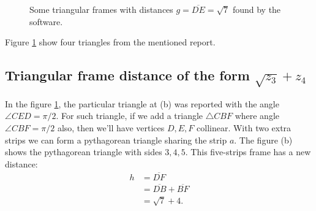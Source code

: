 \documentclass[11pt]{article}
\begin{document}
\begin{figure}[h]
 \centering
\caption{Some triangular frames with distances $g = \overline{DE}=\sqrt{7}$ found by the software.
}
\label{fig:surd7}
\end{figure}

Figure \ref{fig:surd7} show four triangles from the mentioned report.

\subsection{Triangular frame distance of the form $\sqrt{z_3} + z_4$}

In the figure \ref{fig:surd7}, the particular triangle at (b) was reported with the angle $\angle{CED}=\pi/2$. For such triangle, if we add a triangle $\triangle{CBF}$ where angle $\angle{CBF} = \pi/2$ also, then we'll have vertices $D,E,F$ collinear. With two extra strips we can form a pythagorean triangle sharing the strip $a$. The figure (b) shows the pythagorean triangle with sides $3,4,5$. This five-strips frame has a new distance:
\begin{align*}
h &= \overline{DF}\\
 &= \overline{DB} + \overline{BF} \\
 & = \sqrt{7} + 4.
\end{align*}
\end{document}
